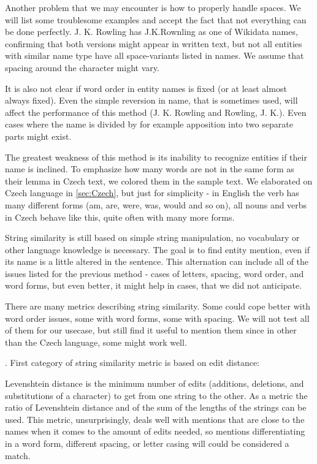 Another problem that we may encounter is how to properly handle spaces. We will list some troublesome examples and accept the fact that not everything can be done perfectly. J. K. Rowling has J.K.Rownling as one of Wikidata names, confirming that both versions might appear in written text, but not all entities with similar name type have all space-variants listed in names. We assume that spacing around the \vuvozovkach{-} character might vary.

It is also not clear if word order in entity names is fixed (or at least almost always fixed). Even the simple reversion in name, that is sometimes used, will affect the performance of this method (J. K. Rowling and Rowling, J. K.).  Even cases where the name is divided by for example apposition into two separate parts might exist.

The greatest weakness of this method is its inability to recognize entities if their name is inclined. To emphasize how many words are not in the same form as their lemma in Czech text, we colored them in the sample text.  We elaborated on Czech language in \autoref{sec:Czech}, but just for simplicity - in English the verb  has many different forms (am, are, were, was, would and so on), all nouns and verbs in Czech behave like this, quite often with many more forms.

 String similarity is still based on simple string manipulation, no vocabulary or other language knowledge is necessary. The goal is to find entity mention, even if its name is a little altered in the sentence. This alternation can include all of the issues listed for the previous method - cases of letters, spacing, word order, and word forms, but even better, it might help in cases, that we did not anticipate.

There are many metrics describing string similarity. Some could cope better with word order issues, some with word forms, some with spacing. We will not test all of them for our usecase, but still find it useful to mention them since in other than the Czech language, some might work well.

. First category of string similarity metric is based on edit distance:

Levenshtein distance is the minimum number of edits (additions, deletions, and substitutions of a character) to get from one string to the other. As a metric the ratio of Levenshtein distance and of the sum of the lengths of the strings can be used. This metric, unsurprisingly, deals well with mentions that are close to the names when it comes to the amount of edits needed, so mentions differentiating in a word form, different spacing, or letter casing will could be considered a match.

